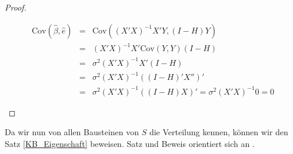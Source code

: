 \documentclass[12pt,a4paper]{article}
\theoremstyle{definition}
\theoremstyle{definition}
\theoremstyle{definition}
\theoremstyle{definition}
\begin{document}
\begin{proof}
\begin{enumerate}
\begin{eqnarray*}
\text{Cov}(\hat{\beta},\hat{e}) &=& \text{Cov}((X'X)^{-1} X' Y, (I-H)Y) \\
&=& (X'X)^{-1} X' \text{Cov}(Y,Y) (I-H) \\
&=& \sigma^2 (X'X)^{-1} X' (I-H) \\
&=& \sigma^2 (X'X)^{-1} ((I-H)'X'')' \\
&=& \sigma^2 (X'X)^{-1} ((I-H) X)' = \sigma^2 (X'X)^{-1} 0 = 0
\end{eqnarray*}

\end{enumerate}
\end{proof}

Da wir nun von allen Bausteinen von $S$ die Verteilung kennen, können wir den Satz \ref{KB_Eigenschaft} beweisen. Satz und Beweis orientiert sich an \cite[66]{Liu64}.
\end{document}

